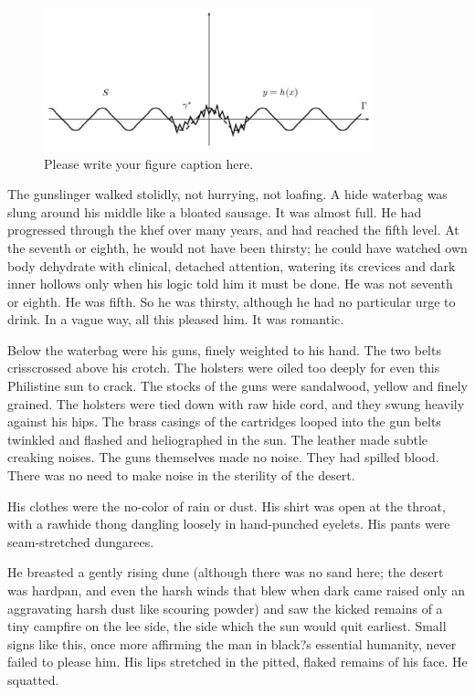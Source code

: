 \documentclass[
11pt,%
tightenlines,%
twoside,%
onecolumn,%
nofloats,%
nobibnotes,%
nofootinbib,%
superscriptaddress,%
noshowpacs,%
centertags]%
{revtex4}
\begin{document}
\begin{figure}[h]
\setcaptionmargin{5mm}
\onelinecaptionstrue  %
\includegraphics[width=0.85\textwidth]{deform.eps}
\caption{Please write your figure caption here.}\label{fig:1}
\end{figure}

The gunslinger walked stolidly, not hurrying, not loafing. A hide waterbag was slung around his middle like a bloated sausage. It was almost full. He had progressed through the khef over many years, and had reached the fifth level. At the seventh or eighth, he would not have been thirsty; he could have watched own body dehydrate with clinical, detached attention, watering its crevices and dark inner hollows only when his logic told him it must be done. He was not seventh or eighth. He was fifth. So he was thirsty, although he had no particular urge to drink. In a vague way, all this pleased him. It was romantic.

Below the waterbag were his guns, finely weighted to his hand. The two belts crisscrossed above his crotch. The holsters were oiled too deeply for even this Philistine sun to crack. The stocks of the guns were sandalwood, yellow and finely grained. The holsters were tied down with raw hide cord, and they swung heavily against his hips. The brass casings of the cartridges looped into the gun belts twinkled and flashed and heliographed in the sun. The leather made subtle creaking noises. The guns themselves made no noise. They had spilled blood. There was no need to make noise in the sterility of the desert.

His clothes were the no-color of rain or dust. His shirt was open at the throat, with a rawhide thong dangling loosely in hand-punched eyelets. His pants were seam-stretched dungarees.

He breasted a gently rising dune (although there was no sand here; the desert was hardpan, and even the harsh winds that blew when dark came raised only an aggravating harsh dust like scouring powder) and saw the kicked remains of a tiny campfire on the lee side, the side which the sun would quit earliest. Small signs like this, once more affirming the man in black?s essential humanity, never failed to please him. His lips stretched in the pitted, flaked remains of his face. He squatted.
\end{document}
